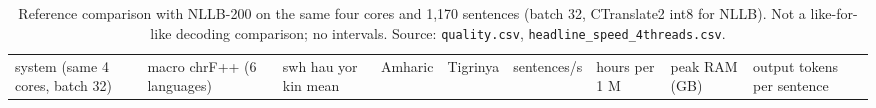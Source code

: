 \begin{table}[t]
\centering
\scriptsize
\setlength{\tabcolsep}{3pt}
\caption{Reference comparison with NLLB-200 on the same four cores and 1,170 sentences (batch 32, CTranslate2 int8 for NLLB). Not a like-for-like decoding comparison; no intervals. Source: \texttt{quality.csv}, \texttt{headline\_speed\_4threads.csv}.}
\label{tab:t_cpu_nllb}
{\def\LTcaptype{none} %
\begin{tabular}{@{}
  >{\raggedright\arraybackslash}p{}
  >{\raggedleft\arraybackslash}p{}
  >{\raggedleft\arraybackslash}p{}
  >{\raggedleft\arraybackslash}p{}
  >{\raggedleft\arraybackslash}p{}
  >{\raggedleft\arraybackslash}p{}
  >{\raggedleft\arraybackslash}p{}
  >{\raggedleft\arraybackslash}p{}
  >{\raggedleft\arraybackslash}p{}@{}}
\toprule
\begin{minipage}[b]{\linewidth}\raggedright
system (same 4 cores, batch 32)
\end{minipage} & \begin{minipage}[b]{\linewidth}\raggedleft
macro chrF++ (6 languages)
\end{minipage} & \begin{minipage}[b]{\linewidth}\raggedleft
swh hau yor kin mean
\end{minipage} & \begin{minipage}[b]{\linewidth}\raggedleft
Amharic
\end{minipage} & \begin{minipage}[b]{\linewidth}\raggedleft
Tigrinya
\end{minipage} & \begin{minipage}[b]{\linewidth}\raggedleft
sentences/s
\end{minipage} & \begin{minipage}[b]{\linewidth}\raggedleft
hours per 1 M
\end{minipage} & \begin{minipage}[b]{\linewidth}\raggedleft
peak RAM (GB)
\end{minipage} & \begin{minipage}[b]{\linewidth}\raggedleft
output tokens per sentence
\end{minipage} \\

\end{tabular}}
\end{table}
